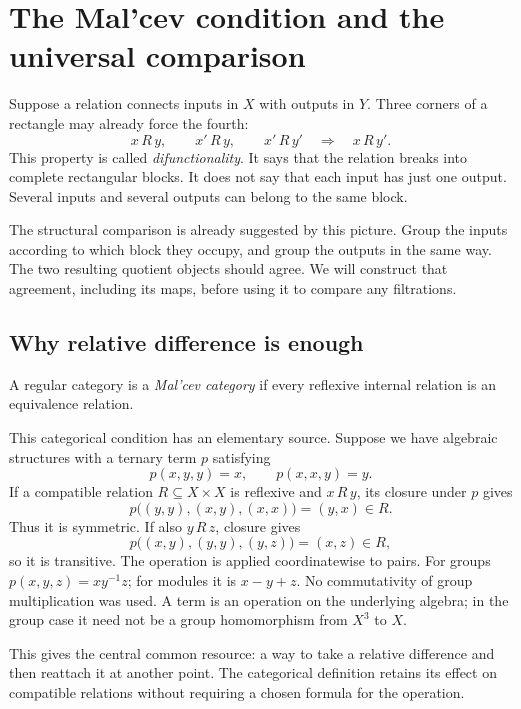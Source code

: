 \section{The Mal'cev condition and the universal comparison}
\label{d:begin}

Suppose a relation connects inputs in $X$ with outputs in $Y$. Three
corners of a rectangle may already force the fourth:
\[
x\,R\,y,\qquad x'\,R\,y,\qquad x'\,R\,y'
\quad\Longrightarrow\quad x\,R\,y'.
\]
This property is called \emph{difunctionality}. It says that the
relation breaks into complete rectangular blocks. It does not say that
each input has just one output. Several inputs and several outputs can
belong to the same block.

The structural comparison is already suggested by this picture. Group
the inputs according to which block they occupy, and group the outputs
in the same way. The two resulting quotient objects should agree. We
will construct that agreement, including its maps, before using it to
compare any filtrations.

\subsection{Why relative difference is enough}

\begin{definition}\label{d:malcev}
A regular category is a \emph{Mal'cev category} if every reflexive
internal relation is an equivalence relation.
\end{definition}

This categorical condition has an elementary source. Suppose we have
algebraic structures with a ternary term $p$ satisfying
\[
p(x,y,y)=x,\qquad p(x,x,y)=y.
\]
If a compatible relation $R\subseteq X\times X$ is reflexive and
$x\,R\,y$, its closure under $p$ gives
\[
p\bigl((y,y),(x,y),(x,x)\bigr)=(y,x)\in R.
\]
Thus it is symmetric. If also $y\,R\,z$, closure gives
\[
p\bigl((x,y),(y,y),(y,z)\bigr)=(x,z)\in R,
\]
so it is transitive. The operation is applied coordinatewise to pairs.
For groups $p(x,y,z)=xy^{-1}z$; for modules it is $x-y+z$. No
commutativity of group multiplication was used. A term is an operation
on the underlying algebra; in the group case it need not be a group
homomorphism from $X^3$ to $X$.

This gives the central common resource: a way to take a relative
difference and then reattach it at another point. The categorical
definition retains its effect on compatible relations without requiring
a chosen formula for the operation.

